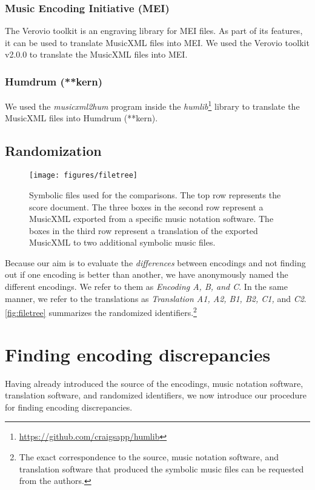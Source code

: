 \subsubsection{Music Encoding Initiative (MEI)}
The Verovio toolkit is an engraving library for MEI files\cite{pugin2014verovio}. As part of its features, it can be used to translate MusicXML files into MEI. We used the Verovio toolkit v2.0.0 to translate the MusicXML files into MEI.

\subsubsection{Humdrum (**kern)}
We used the \emph{musicxml2hum} program inside the \emph{humlib}\footnote{\url{https://github.com/craigsapp/humlib}} library to translate the MusicXML files into Humdrum (**kern).

\subsection{Randomization}
\begin{figure}
\texttt{[image: figures/filetree]}
\caption{Symbolic files used for the comparisons. The top row represents the score document. The three boxes in the second row represent a MusicXML exported from a specific music notation software. The boxes in the third row represent a translation of the exported MusicXML to two additional symbolic music files.}
\label{fig:filetree}
\end{figure}
Because our aim is to evaluate the \emph{differences} between encodings and not finding out if one encoding is better than another, we have anonymously named the different encodings. We refer to them as \emph{Encoding A, B, and C}. In the same manner, we refer to the translations as \emph{Translation A1, A2, B1, B2, C1,} and \emph{C2}. \autoref{fig:filetree} summarizes the randomized identifiers.\footnote{The exact correspondence to the source, music notation software, and translation software that produced the symbolic music files can be requested from the authors.}

\section{Finding encoding discrepancies}
 Having already introduced the source of the encodings, music notation software, translation software, and randomized identifiers, we now introduce our procedure for finding encoding discrepancies.

